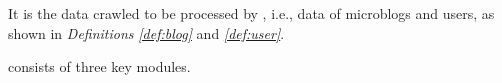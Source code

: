  It is the data crawled to be processed by \sys{}, i.e., data of microblogs and users, as shown in \textit{Definitions} \textit{\ref{def:blog}} and \textit{\ref{def:user}}.

\sys{} consists of three key modules.

